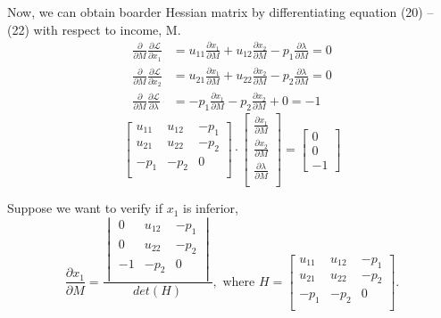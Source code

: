 \documentclass[12pt]{article}
\begin{document}
Now, we can obtain boarder Hessian matrix by differentiating equation (20) --
(22) with respect to income, M. 
\begin{align}
				\frac{\partial  }{\partial M }\frac{\partial \mathscr{L} }{\partial x_1 }
				 &= u_{11}\frac{\partial x_1 }{\partial M  } + u_{12}\frac{\partial 
				 x_2}{\partial M  } - p_1 \frac{\partial \lambda  }{\partial M } = 0\\
				\frac{\partial  }{\partial M }\frac{\partial \mathscr{L} }{\partial x_2 }
				 &= u_{21}\frac{\partial x_1 }{\partial M  } + u_{22}\frac{\partial x_2
				 }{\partial M} - p_2 \frac{\partial \lambda  }{\partial M } = 0\\
				\frac{\partial  }{\partial M }\frac{\partial \mathscr{L} }{\partial
				\lambda } &= -p_1 \frac{\partial x_1 }{\partial M  } - p_2
				\frac{\partial x_2 }{\partial M  } + 0 = -1
\end{align}
\begin{equation}
				\begin{bmatrix}
				u_{11} & u_{12} &-p_1 \\
				u_{21} & u_{22} &-p_2 \\
				-p_1 & -p_2 &0 \\
				\end{bmatrix}\cdot 
				\begin{bmatrix}
				\frac{\partial x_1 }{\partial M  }\\
				\frac{\partial x_2 }{\partial M  }\\
				\frac{\partial \lambda  }{\partial M  }\\
				\end{bmatrix}=
				\begin{bmatrix}
				0\\
				0\\
				-1
				\end{bmatrix}
\end{equation}

Suppose we want to verify if $ x_1 $ is inferior,
\begin{equation}
				\frac{\partial x_1 }{\partial M  } = 
				\frac{
				\begin{vmatrix}
								0 &u_{12} &-p_1\\
								0 &u_{22} &-p_2\\
								-1 &-p_2 &0\\
				\end{vmatrix}
				}{det(H)}, \text{ where }
				H = 
				\begin{bmatrix}
				u_{11} & u_{12} &-p_1 \\
				u_{21} & u_{22} &-p_2 \\
				-p_1 & -p_2 &0 \\
				\end{bmatrix}.
\end{equation}
\end{document}
